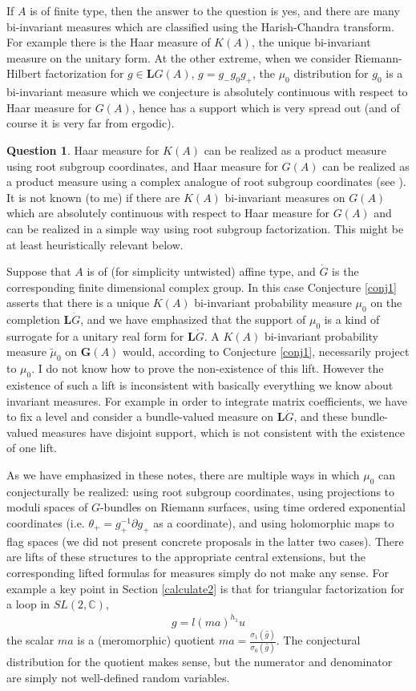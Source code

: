 \documentclass{amsart}
\theoremstyle{conjecture}
\theoremstyle{definition}
\theoremstyle{question}
\newtheorem{question}{Question}
\theoremstyle{questions}
\theoremstyle{remark}
\theoremstyle{remarks}
\theoremstyle{example}
\numberwithin{equation}{section}
\begin{document}
If $A$ is of finite type, then the answer to the question is yes, and there are many bi-invariant measures which are classified using the Harish-Chandra transform. For example there is the Haar measure of $K(A)$, the unique bi-invariant measure on the unitary form. At the other extreme, when we consider Riemann-Hilbert factorization for $g\in \mathbf L G(A)$, $g=g_-g_0g_+$, the $\mu_0$ distribution for $g_0$ is a bi-invariant measure which we conjecture is absolutely continuous with respect to Haar measure for $G(A)$, hence has a support which is very spread out (and of course it is very far from ergodic).

\begin{question}\label{complexRSF} Haar measure for $K(A)$ can be realized as a product measure using root subgroup coordinates, and Haar measure for $G(A)$ can be realized as a product measure using a complex analogue of root subgroup coordinates (see \cite{Pi4.5}). It is not known (to me) if there are $K(A)$ bi-invariant measures on $G(A)$ which are absolutely continuous with respect to Haar measure for $G(A)$ and can be realized in a simple way using root subgroup factorization. This might be at least heuristically relevant below.
\end{question}

Suppose that $A$ is of (for simplicity untwisted) affine type, and $\dot G$ is the corresponding finite dimensional complex group. In this case Conjecture \ref{conj1} asserts that there is a unique $K(A)$ bi-invariant probability measure $\mu_0$ on the completion $\mathbf L \dot G$, and we have emphasized that the support of $\mu_0$ is a kind of surrogate for a unitary real form for $\mathbf L \dot G$. A $K(A)$ bi-invariant probability measure $\widetilde{\mu}_0$ on $\mathbf G(A)$ would, according to Conjecture \ref{conj1}, necessarily project to $\mu_0$. I do not know how to prove the non-existence of this lift. However the existence of such a lift is inconsistent with basically everything we know about invariant measures. For example in order to integrate matrix coefficients, we have to fix a level and consider a bundle-valued measure on $\mathbf L\dot G$, and these bundle-valued measures have disjoint support, which is not consistent with the existence of one lift.

As we have emphasized in these notes, there are multiple ways in which $\mu_0$ can conjecturally be realized:
using root subgroup coordinates, using projections to moduli spaces of $G$-bundles on Riemann surfaces, using
time ordered exponential coordinates (i.e. $\theta_+=g_+^{-1}\partial g_+$ as a coordinate), and using holomorphic maps to flag spaces (we did not present concrete proposals in the latter two cases). There are lifts of these structures to the appropriate central extensions, but the corresponding lifted formulas for measures simply do not make any sense. For example a key point in Section \ref{calculate2} is that for triangular factorization for
a loop in $SL(2,\mathbb C)$,
$$g=l (ma)^{\dot h_1} u$$
the scalar $ma$ is a (meromorphic) quotient $ma=\frac{\sigma_1(\widehat g)}{\sigma_0(\widehat g)}$. The conjectural distribution for the quotient makes sense, but the numerator and denominator are simply not well-defined random variables.
\end{document}
